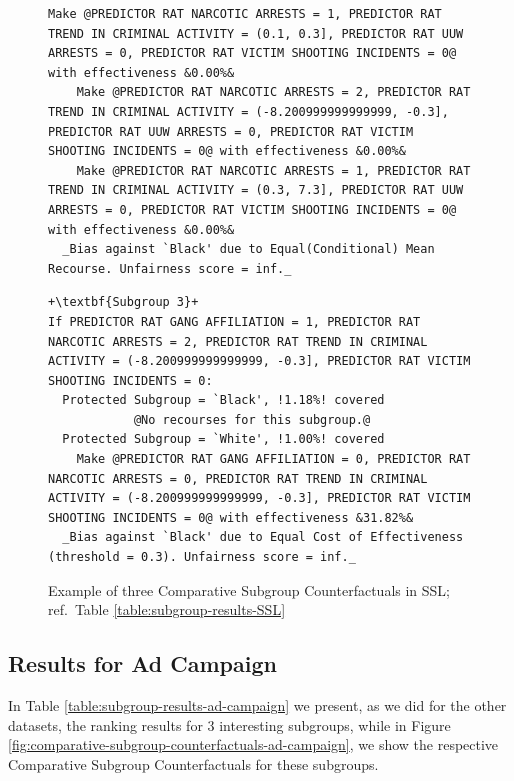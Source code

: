 \documentclass{article}
\begin{document}
\begin{figure}[ht]
\begin{minipage}{1\linewidth}
\begin{lstlisting}[style = base,escapechar=+]
    Make @PREDICTOR RAT NARCOTIC ARRESTS = 1, PREDICTOR RAT TREND IN CRIMINAL ACTIVITY = (0.1, 0.3], PREDICTOR RAT UUW ARRESTS = 0, PREDICTOR RAT VICTIM SHOOTING INCIDENTS = 0@ with effectiveness &0.00%&
    Make @PREDICTOR RAT NARCOTIC ARRESTS = 2, PREDICTOR RAT TREND IN CRIMINAL ACTIVITY = (-8.200999999999999, -0.3], PREDICTOR RAT UUW ARRESTS = 0, PREDICTOR RAT VICTIM SHOOTING INCIDENTS = 0@ with effectiveness &0.00%&
    Make @PREDICTOR RAT NARCOTIC ARRESTS = 1, PREDICTOR RAT TREND IN CRIMINAL ACTIVITY = (0.3, 7.3], PREDICTOR RAT UUW ARRESTS = 0, PREDICTOR RAT VICTIM SHOOTING INCIDENTS = 0@ with effectiveness &0.00%&
  _Bias against `Black' due to Equal(Conditional) Mean Recourse. Unfairness score = inf._
\end{lstlisting}
\begin{lstlisting}[style = base,escapechar=+]
+\textbf{Subgroup 3}+
If PREDICTOR RAT GANG AFFILIATION = 1, PREDICTOR RAT NARCOTIC ARRESTS = 2, PREDICTOR RAT TREND IN CRIMINAL ACTIVITY = (-8.200999999999999, -0.3], PREDICTOR RAT VICTIM SHOOTING INCIDENTS = 0:
  Protected Subgroup = `Black', !1.18%! covered
    		@No recourses for this subgroup.@
  Protected Subgroup = `White', !1.00%! covered
    Make @PREDICTOR RAT GANG AFFILIATION = 0, PREDICTOR RAT NARCOTIC ARRESTS = 0, PREDICTOR RAT TREND IN CRIMINAL ACTIVITY = (-8.200999999999999, -0.3], PREDICTOR RAT VICTIM SHOOTING INCIDENTS = 0@ with effectiveness &31.82%&
  _Bias against `Black' due to Equal Cost of Effectiveness (threshold = 0.3). Unfairness score = inf._
\end{lstlisting}

\caption{Example of three Comparative Subgroup Counterfactuals in SSL; ref.\ Table \ref{table:subgroup-results-SSL}}
\label{fig:comparative-subgroup-counterfactuals-SSL}
\end{minipage}
\end{figure}


\subsection{Results for Ad Campaign}

In Table \ref{table:subgroup-results-ad-campaign} we present, as we did for the other datasets, the ranking results for 3 interesting subgroups, while in Figure \ref{fig:comparative-subgroup-counterfactuals-ad-campaign}, we show the respective Comparative Subgroup Counterfactuals for these subgroups.
\end{document}
